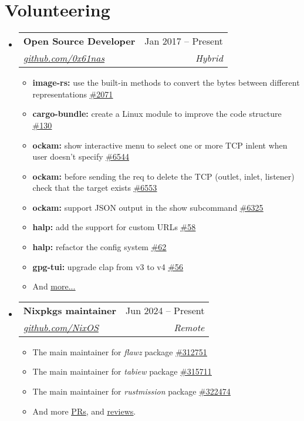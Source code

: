 \documentclass[letterpaper,11pt]{article}
\makeatletter
\newcommand{\resumeItem}[1]{
  \item\small{
    {#1 \vspace{-2pt}}
  }
}
\newcommand{\resumeSubheading}[4]{
  \vspace{-2pt}\item
    \begin{tabular*}{0.97\textwidth}[t]{l@{\extracolsep{\fill}}r}
      \textbf{#1} & #2 \\
      \textit{\small#3} & \textit{\small #4} \\
    \end{tabular*}\vspace{-7pt}
}
\newcommand{\resumeSubHeadingListStart}{\begin{itemize}[leftmargin=0.15in, label={}]}
\newcommand{\resumeSubHeadingListEnd}{\end{itemize}}
\newcommand{\resumeItemListStart}{\begin{itemize}}
\newcommand{\resumeItemListEnd}{\end{itemize}\vspace{-5pt}}
\makeatother
\begin{document}
\section{Volunteering}
  \resumeSubHeadingListStart
    \resumeSubheading
       {Open Source Developer}{Jan 2017 -- Present}
      {\href{https://github.com/0x61nas}{github.com/0x61nas}}{Hybrid}
      \resumeItemListStart
        \resumeItem{\textbf{image-rs:} use the built-in methods to convert the bytes between different representations \href{https://github.com/image-rs/image/pull/2071}{\underline{\#2071}}}
        \resumeItem{\textbf{cargo-bundle:} create a Linux module to improve the code structure \href{https://github.com/burtonageo/cargo-bundle/pull/130}{\underline{\#130}}}
        \resumeItem{\textbf{ockam:} show interactive menu to select one or more TCP inlent when user doesn't specify \href{https://github.com/build-trust/ockam/pull/6544}{\underline{\#6544}}}
        \resumeItem{\textbf{ockam:} before sending the req to delete the TCP (outlet, inlet, listener) check that the target exists \href{https://github.com/build-trust/ockam/pull/6453}{\underline{\#6553}}}
        \resumeItem{\textbf{ockam:} support JSON output in the show subcommand \href{https://github.com/build-trust/ockam/pull/6325}{\underline{\#6325}}}
        \resumeItem{\textbf{halp:} add the support for custom URLs \href{https://github.com/orhun/halp/pull/58}{\underline{\#58}}}
        \resumeItem{\textbf{halp:} refactor the config system \href{https://github.com/orhun/halp/pull/62}{\underline{\#62}}}
        \resumeItem{\textbf{gpg-tui:} upgrade clap from v3 to v4 \href{https://github.com/orhun/gpg-tui/pull/56}{\underline{\#56}}}
        \resumeItem{And \href{https://github.com/pulls?q=is:pr+author:0x61nas}{\underline{more...}}}
      \resumeItemListEnd

    \resumeSubheading
      {Nixpkgs maintainer}{Jun 2024 -- Present}
      {\href{https://github.com/NixOS}{github.com/NixOS}}{Remote}
      \resumeItemListStart
        \resumeItem{The main maintainer for \emph{flawz} package
            \href{https://github.com/NixOS/nixpkgs/pull/312751}{\underline{\#312751}}}
        \resumeItem{The main maintainer for \emph{tabiew} package
            \href{https://github.com/NixOS/nixpkgs/pull/315711}{\underline{\#315711}}}
        \resumeItem{The main maintainer for \emph{rustmission} package
            \href{https://github.com/NixOS/nixpkgs/pull/322474}{\underline{\#322474}}}
        \resumeItem{And more
        \href{https://github.com/NixOS/nixpkgs/pulls?q=is\%3Apr+author\%3A0x61nas+is\%3Aclosed}{\underline{PRs}},
        and
        \href{https://github.com/NixOS/nixpkgs/pulls?q=is\%3Apr+is\%3Aclosed+reviewed-by\%3A0x61nas}{\underline{reviews}}.
        }
      \resumeItemListEnd
  \resumeSubHeadingListEnd
\end{document}
